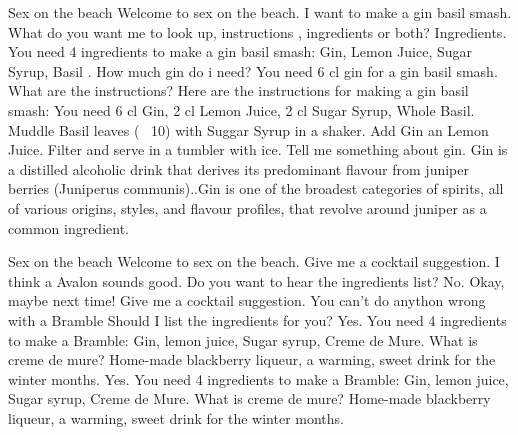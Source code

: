 \documentclass[12pt,letterpaper]{article}
\begin{document}
\begin{dialogue}
	 Sex on the beach
	 Welcome to sex on the beach.
	 I want to make a gin basil smash.
	 What do you want me to look up, instructions , ingredients or both?
	 Ingredients.
	 You need 4 ingredients to make a gin basil smash: Gin, Lemon Juice, Sugar Syrup, Basil .
	 How much gin do i need?
	 You need 6 cl gin for a gin basil smash.
	 What are the instructions?
	 Here are the instructions for making a gin basil smash: You need 6 cl Gin, 2 cl Lemon Juice, 2 cl Sugar Syrup, Whole Basil. Muddle Basil leaves (~ 10) with Suggar Syrup in a shaker. Add Gin an Lemon Juice. Filter and serve in a tumbler with ice.
	 Tell me something about gin.
	 Gin is a distilled alcoholic drink that derives its predominant flavour from juniper berries (Juniperus communis)..Gin is one of the broadest categories of spirits, all of various origins, styles, and flavour profiles, that revolve around juniper as a common ingredient.
	
\end{dialogue}

\begin{dialogue}
	 Sex on the beach
	 Welcome to sex on the beach.
	 Give me a cocktail suggestion.
	 I think a Avalon sounds good. Do you want to hear the ingredients list?
	 No.
	 Okay, maybe next time!
	 Give me a cocktail suggestion.
	 You can't do anython wrong with a Bramble Should I list the ingredients for you?
	 Yes.
	 You need 4 ingredients to make a Bramble: Gin, lemon juice, Sugar syrup, Creme de Mure.
	 What is creme de mure?
	 Home-made blackberry liqueur, a warming, sweet drink for the winter months.
	 Yes.
	 You need 4 ingredients to make a Bramble: Gin, lemon juice, Sugar syrup, Creme de Mure.
	 What is creme de mure?
	 Home-made blackberry liqueur, a warming, sweet drink for the winter months.
	
\end{dialogue}
\end{document}
